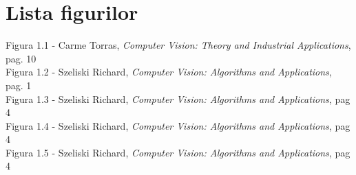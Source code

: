\documentclass[a4paper,12pt]{report}
\begin{document}
\chapter*{Lista figurilor}
Figura 1.1 - Carme Torras, \textit {Computer Vision: Theory and Industrial Applications}, pag. 10\\
Figura 1.2 - Szeliski Richard, \textit {Computer Vision: Algorithms and Applications}, pag. 1 \\
Figura 1.3 - Szeliski Richard, \textit {Computer Vision: Algorithms and Applications}, pag 4 \\
Figura 1.4 - Szeliski Richard, \textit {Computer Vision: Algorithms and Applications}, pag 4 \\
Figura 1.5 - Szeliski Richard, \textit {Computer Vision: Algorithms and Applications}, pag 4 \\
\end{document}
